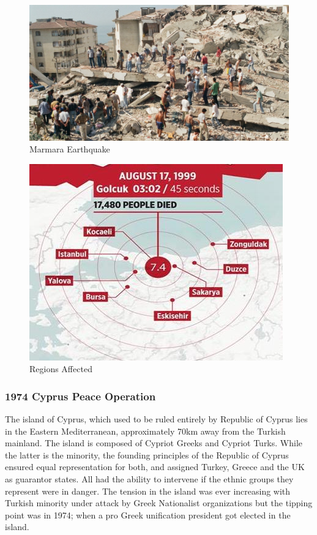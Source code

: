 \documentclass[12pt]{article}
\begin{document}
\begin{subfigure}[t]{.49\textwidth}
    \includegraphics[scale=0.15]{paper/figures/earthquake_marmara2.jpeg}
	\caption{Marmara Earthquake}
	\end{subfigure}
	\begin{subfigure}[t]{.49\textwidth}
    \includegraphics[scale=0.3]{paper/figures/marmara_affected.jpeg}
	\caption{Regions Affected}
\end{subfigure}

\subsubsection{1974 Cyprus Peace Operation}

The island of Cyprus, which used to be ruled entirely by Republic of Cyprus lies in the Eastern Mediterranean, approximately 70km away from the Turkish mainland. The island is composed of Cypriot Greeks and Cypriot Turks. While the latter is the minority, the founding principles of the Republic of Cyprus ensured equal representation for both, and assigned Turkey, Greece and the UK as guarantor states. All had the ability to intervene if the ethnic groups they represent were in danger. The tension in the island was ever increasing with Turkish minority under attack by Greek Nationalist organizations but the tipping point was in 1974; when a pro Greek unification president got elected in the island. 
\end{document}
